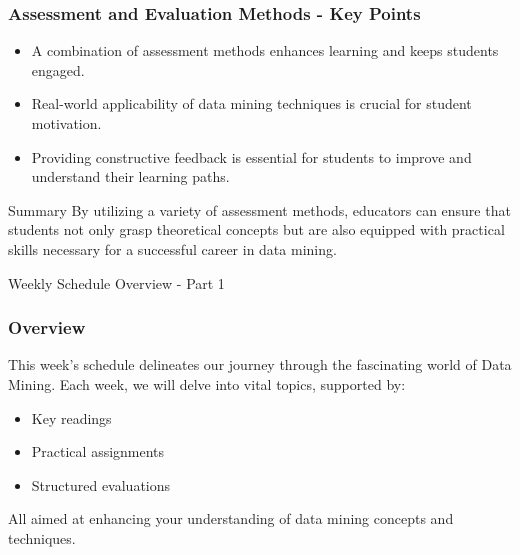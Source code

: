 \documentclass[aspectratio=169]{beamer}
\begin{document}
\begin{frame}[fragile]
    \frametitle{Assessment and Evaluation Methods - Key Points}
    \begin{itemize}
        \item A combination of assessment methods enhances learning and keeps students engaged.
        \item Real-world applicability of data mining techniques is crucial for student motivation.
        \item Providing constructive feedback is essential for students to improve and understand their learning paths.
    \end{itemize}
    
    \begin{block}{Summary}
        By utilizing a variety of assessment methods, educators can ensure that students not only grasp theoretical concepts but are also equipped with practical skills necessary for a successful career in data mining.
    \end{block}
\end{frame}

\begin{frame}[fragile]{Weekly Schedule Overview - Part 1}
  \frametitle{Overview}
  This week's schedule delineates our journey through the fascinating world of Data Mining. Each week, we will delve into vital topics, supported by:
  \begin{itemize}
    \item Key readings
    \item Practical assignments
    \item Structured evaluations
  \end{itemize}
  All aimed at enhancing your understanding of data mining concepts and techniques.
\end{frame}
\end{document}
